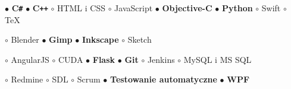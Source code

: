 \documentclass[11pt,a4paper]{article}
\begin{document}
    \bigskip

  
  
    \smallskip


    \smallskip
    $\bullet$ {\bf C\texttt{\#}}
    \hspace{0.34cm}
    $\bullet$ {\bf C\texttt{++}}
    \hspace{0.34cm}
    $\circ$ HTML i CSS
    \hspace{0.34cm}
    $\circ$ JavaScript
    \hspace{0.34cm}
    $\bullet$ {\bf Objective-C}
    \hspace{0.34cm}
    $\bullet$ {\bf Python}
    \hspace{0.34cm}
    $\circ$ Swift
    \hspace{0.34cm}
    $\circ$ TeX


    \smallskip


    \smallskip
    $\circ$ Blender
    \hspace{0.34cm}
    $\bullet$ {\bf Gimp}
    \hspace{0.34cm}
    $\bullet$ {\bf Inkscape}
    \hspace{0.34cm}
    $\circ$ Sketch


    \smallskip


    \smallskip
    $\circ$ AngularJS
    \hspace{0.34cm}
    $\circ$ CUDA
    \hspace{0.34cm}
    $\bullet$ {\bf Flask}
    \hspace{0.34cm}
    $\bullet$ {\bf Git}
    \hspace{0.34cm}
    $\circ$ Jenkins
    \hspace{0.34cm}
    $\circ$ MySQL i MS SQL

    \vspace{0.04cm}
    $\circ$ Redmine
    \hspace{0.34cm}
    $\circ$ SDL
    \hspace{0.34cm}
    $\circ$ Scrum
    \hspace{0.34cm}
    $\bullet$ {\bf Testowanie automatyczne}
    \hspace{0.34cm}
    $\bullet$ {\bf WPF}
  
\end{document}

